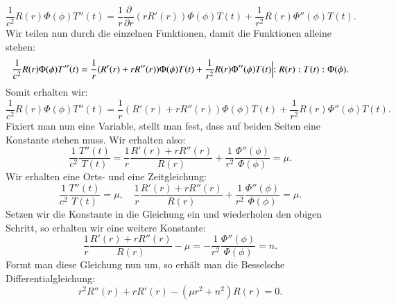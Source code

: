 \begin{equation}
\frac{1}{c^2} R(r) \Phi(\phi) T''(t) = \frac{1}{r} \frac{\partial}{\partial r}(r R'(r)) \Phi(\phi) T(t) + \frac{1}{r^2} R(r) \Phi''(\phi) T(t)
.
\end{equation}
Wir teilen nun durch die einzelnen Funktionen, damit die Funktionen alleine stehen:
\begin{equation}
\frac{1}{c^2} R(r) \Phi(\phi) T''(t) = \frac{1}{r}(R'(r) + rR''(r)) \Phi(\phi) T(t) + \frac{1}{r^2} R(r) \Phi''(\phi) T(t)
\Bigl\lvert
:R(r) : T(t) :\Phi(\phi)
.
\end{equation}
Somit erhalten wir:
\begin{equation}
\frac{1}{c^2} R(r) \Phi(\phi) T''(t) = \frac{1}{r} (R'(r) + rR''(r)) \Phi(\phi) T(t) + \frac{1}{r^2} R(r) \Phi''(\phi) T(t)
.
\end{equation}
Fixiert man nun eine Variable, stellt man fest, dass auf beiden Seiten eine Konstante stehen muss. Wir erhalten also:
\begin{equation}
\frac{1}{c^2}
\frac{T''(t)}{T(t)} = 
\frac{1}{r} 
\frac{R'(r) + rR''(r)}{R(r)} + 
\frac{1}{r^2}
\frac{\Phi''(\phi)}{\Phi(\phi)} = \mu.
\end{equation}
Wir erhalten eine Orts- und eine Zeitgleichung:
\begin{equation}
\frac{1}{c^2} 
\frac{T''(t)}{T(t)} = 
\mu
,\quad
\frac{1}{r} \frac{R'(r) + rR''(r)}{R(r)} + 
\frac{1}{r^2} \frac{\Phi''(\phi)}{\Phi(\phi)} = 
\mu
.
\label{eq:separiertegleichung}
\end{equation}
Setzen wir die Konstante in die Gleichung ein und wiederholen den obigen Schritt, so erhalten wir eine weitere Konstante:
\begin{equation}
\frac{1}{r} \frac{R'(r) + rR''(r)}{R(r)} - \mu =
-\frac{1}{r^2} \frac{\Phi''(\phi)}{\Phi(\phi)} = n
.
\end{equation}
Formt man diese Gleichung nun um, so erhält man die Besselsche Differentialgleichung:
\begin{equation}
r^2 R''(r) + r R'(r) - (\mu r^2 + n^2)R(r) = 0
\label{eq:besselsche_dgl}
.
\end{equation}
